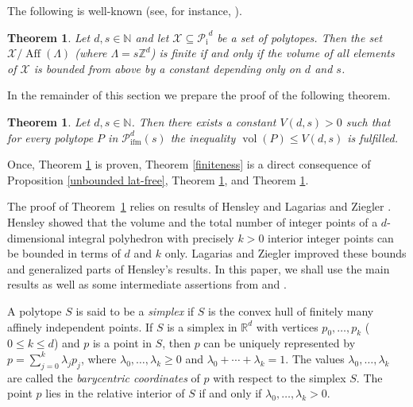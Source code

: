 \documentclass[a4paper]{article}
\theoremstyle{plain}
\newtheorem{theorem}[nn]{Theorem}
\begin{document}
The following is well-known (see, for instance,
\cite[Theorem\,2]{lagarias-ziegler-1991}).

\begin{theorem} \label{vol-bound<=>finiteness}
Let $d,s \in {\mathbb{N}}$ and let ${\mathcal{X}} \subseteq {{\mathcal{P}}_{{\mathop{\mathrm{{i}}}}}}^d$ be a set
of polytopes.
Then the set ${\mathcal{X}} / {{\mathop{\mathrm{{Aff}}}}}(\Lambda)$ (where $\Lambda=s
{\mathbb{Z}}^d$)  is finite if and only if the volume of all
elements of ${\mathcal{X}}$ is bounded from above by a constant
depending only on $d$ and $s$.
\end{theorem}

In the remainder of this section we prepare the proof of the
following theorem.

\begin{theorem} \label{finite-volume}
Let $d,s \in {\mathbb{N}}$.
Then there exists a constant $V(d,s) > 0$ such that for every
polytope $P$ in ${{\mathcal{P}}_{{\mathop{\mathrm{{ifm}}}}}^{{d}}({s})}$ the inequality ${{\mathop{\mathrm{{vol}}}}}(P) \le
V(d,s)$ is fulfilled.
\end{theorem}

Once, Theorem \ref{finite-volume} is proven, Theorem
\ref{finiteness} is a direct consequence of Proposition
\ref{unbounded lat-free}, Theorem
\ref{vol-bound<=>finiteness}, and Theorem
\ref{finite-volume}.

The proof of Theorem~\ref{finite-volume} relies on results
of Hensley \cite{hensley-1983} and Lagarias and Ziegler
\cite{lagarias-ziegler-1991}.
Hensley \cite{hensley-1983} showed that the volume and
the total number of integer points of a $d$-dimensional
integral polyhedron with precisely $k>0$ interior
integer points can be bounded in terms of $d$ and $k$ only.
Lagarias and Ziegler \cite{lagarias-ziegler-1991} improved
these bounds and generalized parts of Hensley's results.
In this paper, we shall use the main results as well as
some intermediate assertions from \cite{hensley-1983} and
\cite{lagarias-ziegler-1991}.

A polytope $S$ is said to be a {\emph{{simplex}}} if $S$ is the
convex hull of finitely many affinely independent points.
If $S$ is a simplex in ${\mathbb{R}}^d$ with vertices
$p_0, \ldots, p_k$ ($0 \le k \le d$) and $p$ is a point in
$S$, then $p$ can be uniquely represented by
$p = \sum_{j=0}^k \lambda_j p_j$, where $\lambda_0, \ldots,
\lambda_k \ge 0$ and $\lambda_0 + \cdots + \lambda_k = 1$.
The values $\lambda_0, \ldots, \lambda_k$ are called the
{\emph{{barycentric coordinates}}} of $p$ with respect to the
simplex $S$.
The point $p$ lies in the relative interior of $S$
if and only if $\lambda_0, \ldots, \lambda_k > 0$.
\end{document}
